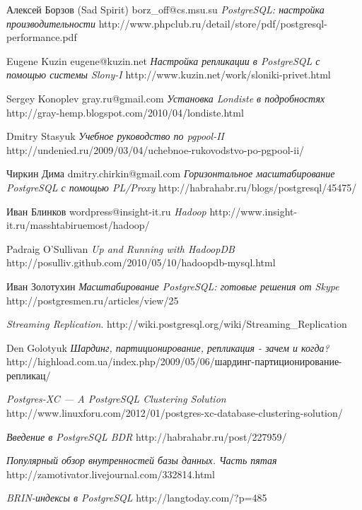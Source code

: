 \renewcommand\bibname{Литература}

\begin{thebibliography}{9}

  Алексей Борзов (Sad Spirit) borz\_off@cs.msu.su
  \emph{PostgreSQL: настройка производительности}
  http://www.phpclub.ru/detail/store/pdf/postgresql-performance.pdf

  Eugene Kuzin eugene@kuzin.net
  \emph{Настройка репликации в PostgreSQL с помощью системы Slony-I}
  http://www.kuzin.net/work/sloniki-privet.html

  Sergey Konoplev gray.ru@gmail.com
  \emph{Установка Londiste в подробностях}
  http://gray-hemp.blogspot.com/2010/04/londiste.html

  Dmitry Stasyuk
  \emph{Учебное руководство по pgpool-II}
  http://undenied.ru/2009/03/04/uchebnoe-rukovodstvo-po-pgpool-ii/

  Чиркин Дима dmitry.chirkin@gmail.com
  \emph{Горизонтальное масштабирование PostgreSQL с помощью PL/Proxy}
  http://habrahabr.ru/blogs/postgresql/45475/

  Иван Блинков wordpress@insight-it.ru
  \emph{Hadoop}
  http://www.insight-it.ru/masshtabiruemost/hadoop/

  Padraig O'Sullivan
  \emph{Up and Running with HadoopDB}
  http://posulliv.github.com/2010/05/10/hadoopdb-mysql.html

  Иван Золотухин
  \emph{Масштабирование PostgreSQL: готовые решения от Skype}
  http://postgresmen.ru/articles/view/25

  \emph{Streaming Replication}.
  http://wiki.postgresql.org/wiki/Streaming\_Replication

  Den Golotyuk
  \emph{Шардинг, партиционирование, репликация - зачем и когда?}
  http://highload.com.ua/index.php/2009/05/06/шардинг-партиционирование-репликац/

  \emph{Postgres-XC — A PostgreSQL Clustering Solution}
  http://www.linuxforu.com/2012/01/postgres-xc-database-clustering-solution/

  \emph{Введение в PostgreSQL BDR}
  http://habrahabr.ru/post/227959/

  \emph{Популярный обзор внутренностей базы данных. Часть пятая}
  http://zamotivator.livejournal.com/332814.html

  \emph{BRIN-индексы в PostgreSQL}
  http://langtoday.com/?p=485


\end{thebibliography}
